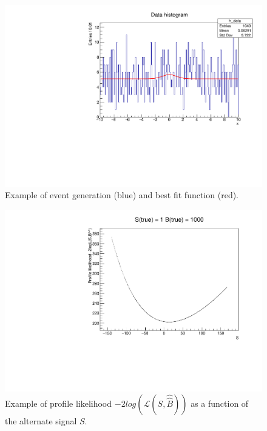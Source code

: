 \documentclass[10pt, oneside]{article}   	%
\begin{document}
\begin{figure}[h!]
    \centering
    \includegraphics[width=\textwidth]{Events_S1B1000.pdf}
    \caption{Example of event generation (blue) and best fit function (red).}
    \label{fig:events_b1000}
\end{figure}

\begin{figure}[h!]
    \centering
    \includegraphics[width=\textwidth]{ProfileLikelihood_S1B1000.pdf}
    \caption{Example of profile likelihood $-2log(\mathcal{L}(S,\hat{\hat{B}}))$ as a function of the alternate signal $S$.}
    \label{fig:profileL_b1000}
\end{figure}

\newpage
\end{document}
